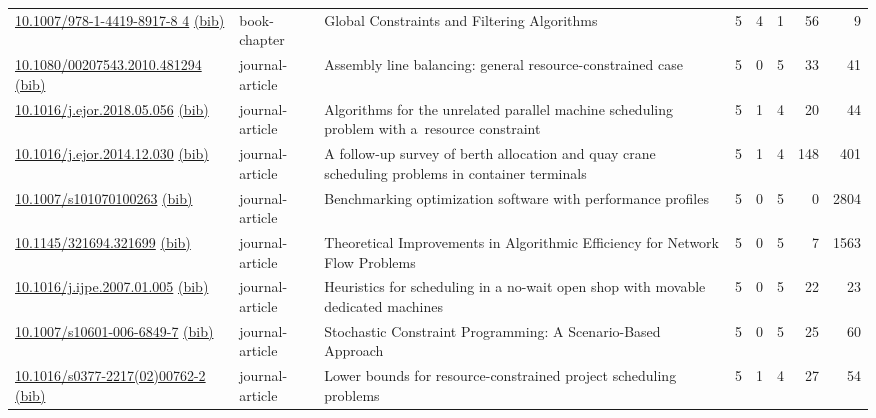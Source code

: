 {\begin{longtable}{p{5cm}lp{11cm}rrrrr}
\href{http://dx.doi.org/10.1007/978-1-4419-8917-8_4}{10.1007/978-1-4419-8917-8 4} \href{https://www.doi2bib.org/bib/10.1007/978-1-4419-8917-8_4}{(bib)} & book-chapter & Global Constraints and Filtering Algorithms & 5 & 4 & 1 & 56 & 9 \\
\href{http://dx.doi.org/10.1080/00207543.2010.481294}{10.1080/00207543.2010.481294} \href{https://www.doi2bib.org/bib/10.1080/00207543.2010.481294}{(bib)} & journal-article & Assembly line balancing: general resource-constrained case & 5 & 0 & 5 & 33 & 41 \\
\href{http://dx.doi.org/10.1016/j.ejor.2018.05.056}{10.1016/j.ejor.2018.05.056} \href{https://www.doi2bib.org/bib/10.1016/j.ejor.2018.05.056}{(bib)} & journal-article & Algorithms for the unrelated parallel machine scheduling problem with a resource constraint & 5 & 1 & 4 & 20 & 44 \\
\href{http://dx.doi.org/10.1016/j.ejor.2014.12.030}{10.1016/j.ejor.2014.12.030} \href{https://www.doi2bib.org/bib/10.1016/j.ejor.2014.12.030}{(bib)} & journal-article & A follow-up survey of berth allocation and quay crane scheduling problems in container terminals & 5 & 1 & 4 & 148 & 401 \\
\href{http://dx.doi.org/10.1007/s101070100263}{10.1007/s101070100263} \href{https://www.doi2bib.org/bib/10.1007/s101070100263}{(bib)} & journal-article & Benchmarking optimization software with performance profiles & 5 & 0 & 5 & 0 & 2804 \\
\href{http://dx.doi.org/10.1145/321694.321699}{10.1145/321694.321699} \href{https://www.doi2bib.org/bib/10.1145/321694.321699}{(bib)} & journal-article & Theoretical Improvements in Algorithmic Efficiency for Network Flow Problems & 5 & 0 & 5 & 7 & 1563 \\
\href{http://dx.doi.org/10.1016/j.ijpe.2007.01.005}{10.1016/j.ijpe.2007.01.005} \href{https://www.doi2bib.org/bib/10.1016/j.ijpe.2007.01.005}{(bib)} & journal-article & Heuristics for scheduling in a no-wait open shop with movable dedicated machines & 5 & 0 & 5 & 22 & 23 \\
\href{http://dx.doi.org/10.1007/s10601-006-6849-7}{10.1007/s10601-006-6849-7} \href{https://www.doi2bib.org/bib/10.1007/s10601-006-6849-7}{(bib)} & journal-article & Stochastic Constraint Programming: A Scenario-Based Approach & 5 & 0 & 5 & 25 & 60 \\
\href{http://dx.doi.org/10.1016/s0377-2217(02)00762-2}{10.1016/s0377-2217(02)00762-2} \href{https://www.doi2bib.org/bib/10.1016/s0377-2217(02)00762-2}{(bib)} & journal-article & Lower bounds for resource-constrained project scheduling problems & 5 & 1 & 4 & 27 & 54 \\

\end{longtable}}
